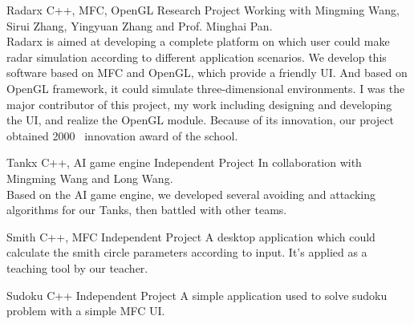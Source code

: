 \documentclass[11pt,a4paper]{moderncv}
\begin{document}
\vspace*{0.2\baselineskip}
{Radarx}
{C++, MFC, OpenGL}
{Research Project}{}
{Working with Mingming Wang, Sirui Zhang, Yingyuan Zhang and Prof. Minghai Pan. \\
Radarx is aimed at developing a complete platform on which user could make radar simulation according to different application scenarios.
We develop this software based on MFC and OpenGL, which provide a friendly UI. And based on OpenGL framework, it could simulate three-dimensional environments. I was the major contributor of this project, my work including designing and developing the UI, and realize the OpenGL module. Because of its innovation, our project obtained 2000 \textyen~innovation award of the school.
}

\vspace*{0.2\baselineskip}
{Tankx}
{C++, AI game engine}
{Independent Project}{}
{In collaboration with Mingming Wang and Long Wang. \\
Based on the AI game engine, we developed several avoiding and attacking algorithms for our Tanks, then battled with other teams.
}




{Smith}
{C++, MFC}
{Independent Project}{}
{
A desktop application which could calculate the smith circle parameters according to input. It's applied as a teaching tool by our teacher.}

\vspace*{0.2\baselineskip}
{Sudoku}
{C++}
{Independent Project}{}
{
A simple application used to solve sudoku problem with a simple MFC UI.
}
\end{document}
